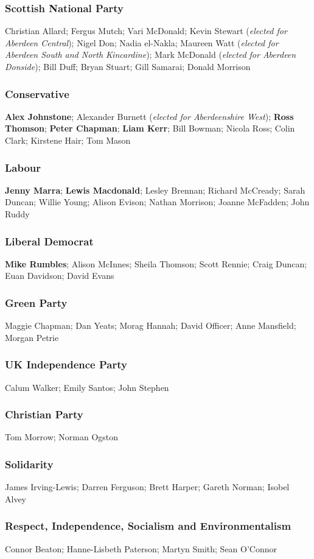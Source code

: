 \begin{resultsiii}
\subsubsection*{Scottish National Party}
Christian Allard; Fergus Mutch; Vari McDonald; Kevin Stewart (\emph{elected for Aberdeen Central}); Nigel Don; Nadia el-Nakla; Maureen Watt (\emph{elected for Aberdeen South and North Kincardine}); Mark McDonald (\emph{elected for Aberdeen Donside}); Bill Duff; Bryan Stuart; Gill Samarai; Donald Morrison
\subsubsection*{Conservative}
\textbf{Alex Johnstone}; Alexander Burnett (\emph{elected for Aberdeenshire West}); \textbf{Ross Thomson}; \textbf{Peter Chapman}; \textbf{Liam Kerr}; Bill Bowman; Nicola Ross; Colin Clark; Kirstene Hair; Tom Mason
\subsubsection*{Labour}
\textbf{Jenny Marra}; \textbf{Lewis Macdonald}; Lesley Brennan; Richard McCready; Sarah Duncan; Willie Young; Alison Evison; Nathan Morrison; Joanne McFadden; John Ruddy
\subsubsection*{Liberal Democrat}
\textbf{Mike Rumbles}; Alison McInnes; Sheila Thomson; Scott Rennie; Craig Duncan; Euan Davidson; David Evans
\subsubsection*{Green Party}
Maggie Chapman; Dan Yeats; Morag Hannah; David Officer; Anne Mansfield; Morgan Petrie
\subsubsection*{UK Independence Party}
Calum Walker; Emily Santos; John Stephen
\subsubsection*{Christian Party}
Tom Morrow; Norman Ogston
\subsubsection*{Solidarity}
James Irving-Lewis; Darren Ferguson; Brett Harper; Gareth Norman; Isobel Alvey
\subsubsection*{Respect, Independence, Socialism and Environmentalism}
Connor Beaton; Hanne-Lisbeth Paterson; Martyn Smith; Sean O'Connor
\end{resultsiii}

